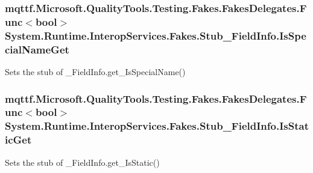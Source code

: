 \hypertarget{class_system_1_1_runtime_1_1_interop_services_1_1_fakes_1_1_stub___field_info_a83da2663328e026ada86544f8411cb1b}{
\subsubsection[{Is\-Special\-Name\-Get}]{\setlength{\rightskip}{0pt plus 5cm}mqttf.\-Microsoft.\-Quality\-Tools.\-Testing.\-Fakes.\-Fakes\-Delegates.\-Func$<$bool$>$ System.\-Runtime.\-Interop\-Services.\-Fakes.\-Stub\-\_\-\-Field\-Info.\-Is\-Special\-Name\-Get}}\label{class_system_1_1_runtime_1_1_interop_services_1_1_fakes_1_1_stub___field_info_a83da2663328e026ada86544f8411cb1b}


Sets the stub of \-\_\-\-Field\-Info.\-get\-\_\-\-Is\-Special\-Name()

\hypertarget{class_system_1_1_runtime_1_1_interop_services_1_1_fakes_1_1_stub___field_info_ab0a9d7776edf145f908572f27ca1fba9}{
\subsubsection[{Is\-Static\-Get}]{\setlength{\rightskip}{0pt plus 5cm}mqttf.\-Microsoft.\-Quality\-Tools.\-Testing.\-Fakes.\-Fakes\-Delegates.\-Func$<$bool$>$ System.\-Runtime.\-Interop\-Services.\-Fakes.\-Stub\-\_\-\-Field\-Info.\-Is\-Static\-Get}}\label{class_system_1_1_runtime_1_1_interop_services_1_1_fakes_1_1_stub___field_info_ab0a9d7776edf145f908572f27ca1fba9}


Sets the stub of \-\_\-\-Field\-Info.\-get\-\_\-\-Is\-Static()

